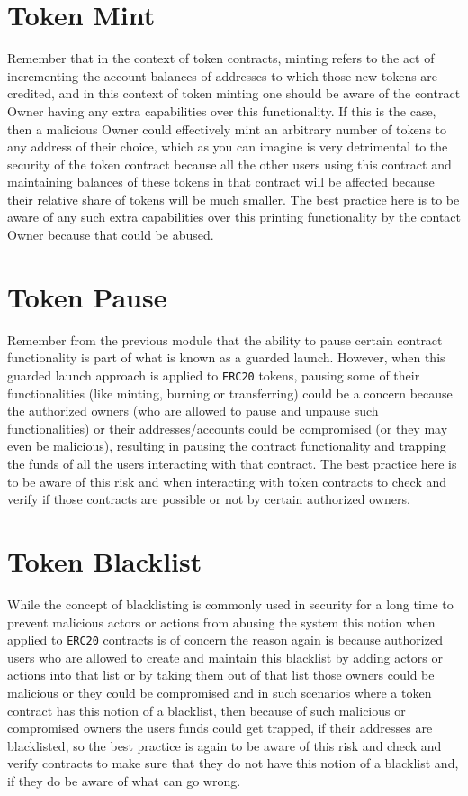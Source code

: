 \section{Token Mint}
Remember that in the context of token contracts, minting refers to the act of incrementing the account balances of addresses to which those new tokens are credited, and in this context of token minting one should be aware of the contract Owner having any extra capabilities over this functionality. If this is the case, then a malicious Owner could effectively mint an arbitrary number of tokens to any address of their choice, which as you can imagine is very detrimental to the security of the token contract because all the other users using this contract and maintaining balances of these tokens in that contract will be affected because their relative share of tokens will be much smaller. The best practice here is to be aware of any such extra capabilities over this printing functionality by the contact Owner because that could be abused.

\section{Token Pause}
Remember from the previous module that the ability to pause certain contract functionality is part of what is known as a guarded launch. However, when this guarded launch approach is applied to \verb|ERC20| tokens, pausing some of their functionalities (like minting, burning or transferring) could be a concern because the authorized owners (who are allowed to pause and unpause such functionalities) or their addresses/accounts could be compromised (or they may even be malicious), resulting in pausing the contract functionality and trapping the funds of all the users interacting with that contract. The best practice here is to be aware of this risk and when interacting with token contracts to check and verify if those contracts are possible or not by certain authorized owners.

\section{Token Blacklist}
While the concept of blacklisting is commonly used in security for a long time to prevent malicious actors or actions from abusing the system this notion when applied to \verb|ERC20| contracts is of concern the reason again is because authorized users who are allowed to create and maintain this blacklist by adding actors or actions into that list or by taking them out of that list those owners could be malicious or they could be compromised and in such scenarios where a token contract has this notion of a blacklist, then because of such malicious or compromised owners the users funds could get trapped, if their addresses are blacklisted, so the best practice is again to be aware of this risk and check and verify contracts to make sure that they do not have this notion of a blacklist and, if they do be aware of what can go wrong.

